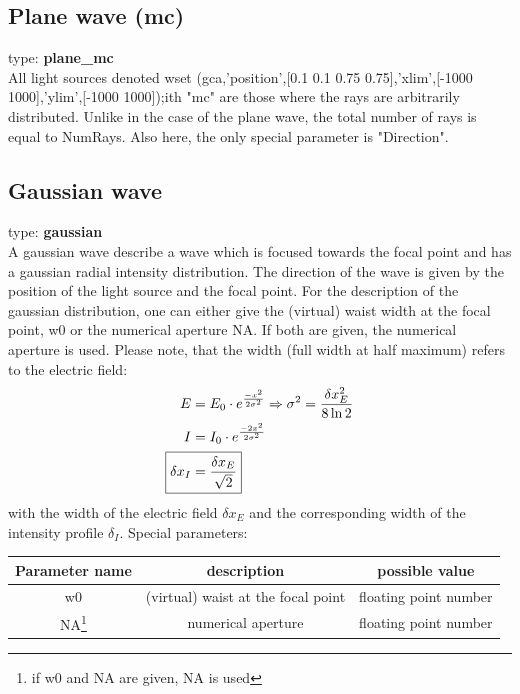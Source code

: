 \documentclass[a4paper,html,11pt,openany]{book}
\begin{document}
 \subsection{Plane wave (mc)} 
 type: \textbf{plane\_mc} \\
 All light sources denoted wset (gca,'position',[0.1 0.1 0.75 0.75],'xlim',[-1000 1000],'ylim',[-1000 1000]);ith "mc" are those where the rays are arbitrarily distributed. Unlike in the case of the plane wave, the total number of rays is equal to NumRays. Also here, the only special parameter is "Direction". 
 
\subsection{Gaussian wave}
 type: \textbf{gaussian} \\
A gaussian wave describe a wave which is focused  towards the focal point and has a gaussian radial intensity distribution. The direction of the wave is given by the position of the light source and the focal point. For the description of the gaussian distribution, one can either give the (virtual) waist width at the focal point, w0 or the numerical aperture NA. If both are given, the numerical aperture is used. Please note, that the width (full width at half maximum) refers to the electric field: \\ 

\begin{align}
E&=E_0 \cdot e^{\frac{-x^2}{2\sigma^2}} \Rightarrow \sigma^2=\frac{\delta x_E^2}{8\ln2} \\
I&=I_0 \cdot e^{\frac{-2x^2}{2\sigma^2}} \\
\Aboxed {\delta x_I&=\frac{\delta x_E}{\sqrt{2}}}
\end{align}
with the width of the electric field $\delta x_E$ and the corresponding width of the intensity profile $\delta_I$.
\vspace{1em}
Special parameters:

\vspace{1em}
 \begin{tabular}{c|c|c}
 Parameter name & description  & possible value \\
 \hline
 w0 & (virtual) waist at the focal point & floating point number \\
 \hline
 NA\footnote{if w0 and NA are given, NA is used} & numerical aperture & floating point number \\ 
 \end{tabular}
\end{document}
